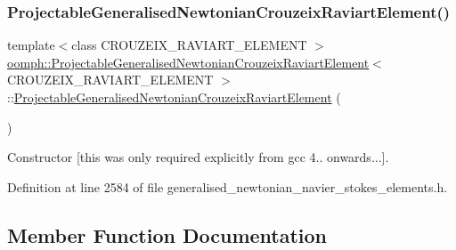 \subsubsection{\texorpdfstring{Projectable\+Generalised\+Newtonian\+Crouzeix\+Raviart\+Element()}{ProjectableGeneralisedNewtonianCrouzeixRaviartElement()}}
{\footnotesize\ttfamily template$<$class C\+R\+O\+U\+Z\+E\+I\+X\+\_\+\+R\+A\+V\+I\+A\+R\+T\+\_\+\+E\+L\+E\+M\+E\+NT $>$ \\
\hyperlink{classoomph_1_1ProjectableGeneralisedNewtonianCrouzeixRaviartElement}{oomph\+::\+Projectable\+Generalised\+Newtonian\+Crouzeix\+Raviart\+Element}$<$ C\+R\+O\+U\+Z\+E\+I\+X\+\_\+\+R\+A\+V\+I\+A\+R\+T\+\_\+\+E\+L\+E\+M\+E\+NT $>$\+::\hyperlink{classoomph_1_1ProjectableGeneralisedNewtonianCrouzeixRaviartElement}{Projectable\+Generalised\+Newtonian\+Crouzeix\+Raviart\+Element} (\begin{DoxyParamCaption}{ }\end{DoxyParamCaption})\hspace{0.3cm}{\ttfamily [inline]}}



Constructor \mbox{[}this was only required explicitly from gcc 4.. onwards...\mbox{]}. 



Definition at line 2584 of file generalised\+\_\+newtonian\+\_\+navier\+\_\+stokes\+\_\+elements.\+h.



\subsection{Member Function Documentation}
\mbox{\label{classoomph_1_1ProjectableGeneralisedNewtonianCrouzeixRaviartElement_aee4e12ec586f561d681f63dda4d1d3ce}} 

